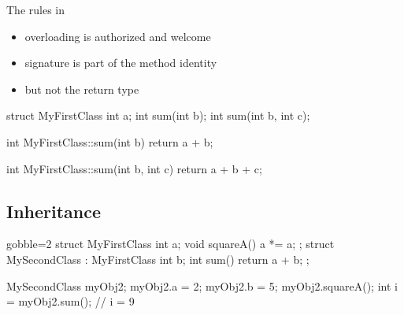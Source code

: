 \begin{frame}[fragile]
  \begin{block}{The rules in \cpp}
    \begin{itemize}
    \item overloading is authorized and welcome
    \item signature is part of the method identity
    \item but not the return type
    \end{itemize}
  \end{block}
  \begin{cppcode}
    struct MyFirstClass {
      int a;
      int sum(int b);
      int sum(int b, int c);
    }

    int MyFirstClass::sum(int b) { return a + b; }

    int MyFirstClass::sum(int b, int c) {
      return a + b + c;
    }
  \end{cppcode}
\end{frame}

\subsection[inherit]{Inheritance}

\begin{frame}[fragile]
  \begin{multicols}{2}
    \begin{cppcode*}{gobble=2}
      struct MyFirstClass {
        int a;
        void squareA() { a *= a; }
      };
      struct MySecondClass :
        MyFirstClass {
        int b;
        int sum() { return a + b; }
      };

      MySecondClass myObj2;
      myObj2.a = 2;
      myObj2.b = 5;
      myObj2.squareA();
      int i = myObj2.sum(); // i = 9
    \end{cppcode*}
    \columnbreak
    \center
    \null \vfill
    \vfill \null
  \end{multicols}
\end{frame}

